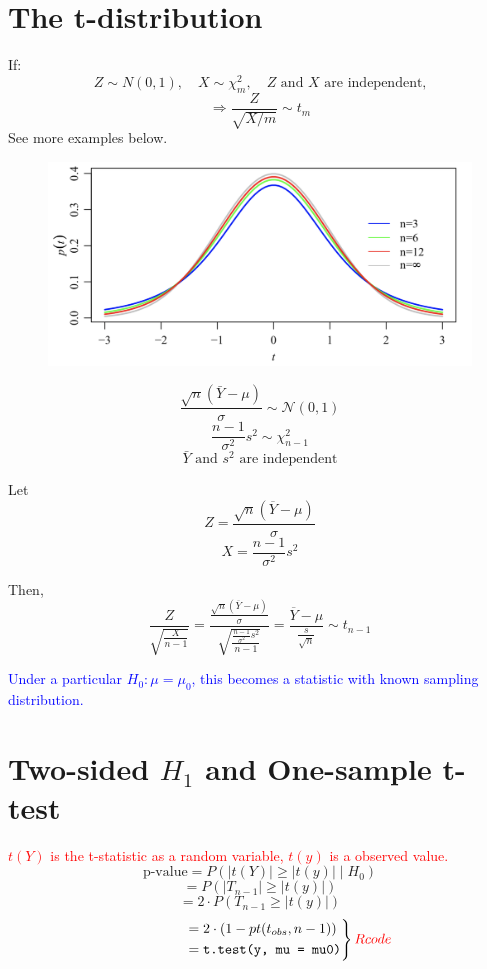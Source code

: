 \documentclass[14pt]{extarticle}
\begin{document}
\section*{The t-distribution}
If:
\[
Z \sim N(0, 1), \quad X \sim \chi^2_m, \quad Z \text{ and } X \text{ are independent,}
\]
\[
\Rightarrow \frac{Z}{\sqrt{X/m}} \sim t_m
\]
See more examples below.
\newpage

\begin{figure}[h]
    \centering
    \includegraphics[width=1\textwidth]{fig5.png}
\end{figure}
\[
\frac{\sqrt{n} \left( \bar{Y} - \mu \right)}{\sigma} \sim \mathcal{N}(0, 1)
\]
\[
\frac{n-1}{\sigma^2} s^2 \sim \chi^2_{n-1}
\]
\[
\bar{Y} \text{ and } s^2 \text{ are independent}
\]

Let
\[
Z = \frac{\sqrt{n} \left( \overline{Y} - \mu \right)}{\sigma}
\]
\[
X = \frac{n - 1}{\sigma^2} s^2
\]

Then, 
\[
\frac{Z}{\sqrt{\frac{X}{n-1}}} = \frac{\frac{\sqrt{n} \left( \overline{Y} - \mu \right)}{\sigma}}{\sqrt{\frac{\frac{n-1}{\sigma^2} s^2}{n-1}}} = \frac{\overline{Y} - \mu}{\frac{s}{\sqrt{n}}} \sim t_{n-1}
\]

\noindent \textcolor{blue}{Under a particular $H_0: \mu = \mu_0$, this becomes a statistic with known sampling distribution.}

\section*{Two-sided $H_1$  and One-sample t-test}
\textcolor{red}{$t(Y)$ is the t-statistic as a random variable, $t(y)$ is a observed value.}
\[
\text{p-value} = P \left( |t(Y)| \geq |t(y)| \mid H_0 \right)
\]
\[
= P(|T_{n-1}| \geq |t(y)|)
\]
\[
= 2 \cdot P(T_{n-1} \geq |t(y)|)
\]
\[
\left.
\begin{aligned}
\quad \quad \quad \quad & = 2 \cdot \left( 1 - pt(t_{obs}, n-1) \right) \\
\quad \quad \quad \quad & = \texttt{t.test(y, mu = mu0)}
\end{aligned}
\right\} \textcolor{red}{R code}
\]
\end{document}
